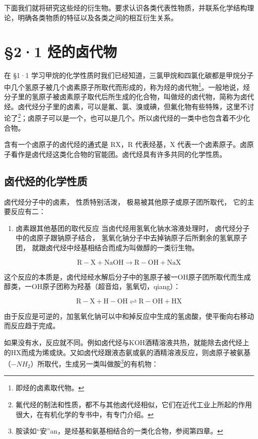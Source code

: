 下面我们就将研究这些烃的衍生物。要求认识各类代表性物质，并联系化学结构理论，明确各类物质的特征以及各类之间的相互衍生关系。

\section{§2·1 烃的卤代物}

在 §1·1
学习甲烷的化学性质时我们已经知道，三氯甲烷和四氯化碳都是甲烷分子中几个氢原子被几个卤素原子所取代而形成的，称为烃的卤代物\footnote{即烃的卤素取代物。}。一般地说，烃分子里的氢原子被卤素原子取代后所生成的化合物，叫做烃的卤代物，简称为卤代烃。卤代烃分子里的卤素，可以是氟、氯、溴或碘，但氟化物有些特殊，这里不讨论了\footnote{氟代烃的制法和性质，都不与其他卤代烃相似，它们在近代工业上所起的作用很大，在有机化学的专书中，有专门介绍。}；卤原子可以是一个，也可以是几个。所以卤代烃的一类中也包含着不少化合物。

含有一个卤原子的卤代烃的通式是 RX，R 代表烃基，X
代表一个卤素原子。卤原子看作是卤代烃这类化合物的官能团。卤代烃具有许多共同的化学性质。

\subsection{卤代烃的化学性质}

卤代烃分子中的卤素， 性质特别活泼， 极易被其他原子或原子团所取代，
它的主要反应有二：

\begin{enumerate}
\item
  卤素跟其他基团的取代反应 当卤代烃用氢氧化钠水溶液处理时，
  卤代烃分子中的卤原子跟钠原子结合，
  氢氧化钠分子中去掉钠原子后所剩余的氢氧原子团，
  就跟卤代烃中烃基相结合而成为叫做醇的一类衍生物。
\end{enumerate}

\[
\mathrm{R}-\mathrm{X}+\mathrm{NaOH}\rightarrow \mathrm{R}-\mathrm{OH}+\mathrm{NaX}
\]

这个反应的本质是，卤代烃经水解后分子中的氢原子被一OH原子团所取代而生成醇类，一OH原子团称为羟基（超音焰，氢氧切，qiang）：

\[
\mathrm{R}-\mathrm{X}+\mathrm{H}-\mathrm{OH}\rightleftharpoons \mathrm{R}-\mathrm{OH}+\mathrm{HX}
\]

由于反应是可逆的，加氢氧化钠可以中和掉反应中生成的氢卤酸，使平衡向右移动而反应趋于完成。

如果没有水，反应就不同。例如卤代烃与KOH酒精溶液共热，就能除去卤代烃上的HX而成为烯或炔。又如卤代烃跟液态氨或氨的酒精溶液反应，则卤原子被氨基（\(-NH_{2}\)）所取代，生成另一类叫做胺\footnote{胺读如``安''an，是烃基和氨基相结合的一类化合物，参阅第四章。}的有机物：

